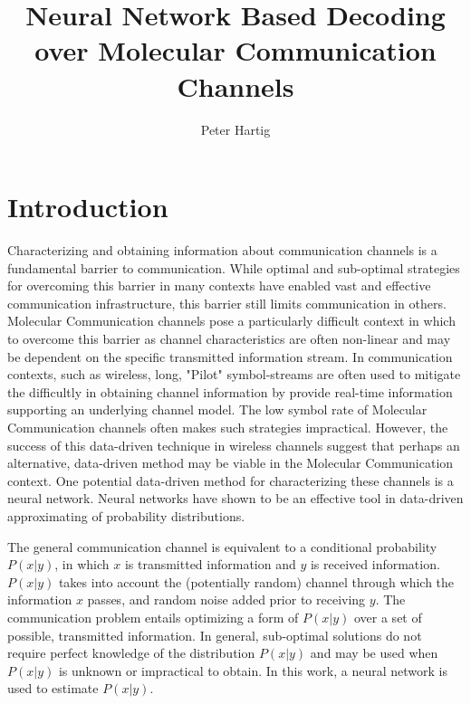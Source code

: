 \documentclass[12pt,a4paper]{report}
\title{Neural Network Based Decoding over Molecular Communication Channels}
\author{Peter Hartig}
\begin{document}
\maketitle

\begin{abstract}

\end{abstract}

\newpage
\tableofcontents
\newpage

\section{Introduction}
Characterizing and obtaining information about communication channels is a fundamental barrier to communication. While optimal and sub-optimal strategies for overcoming this barrier in many contexts have enabled vast and effective communication infrastructure, this barrier still limits communication in others. Molecular Communication channels pose a particularly difficult context in which to overcome this barrier as channel characteristics are often non-linear and may be dependent on the specific transmitted information stream.
In communication contexts, such as wireless, long, "Pilot" symbol-streams are often used to mitigate the difficultly in obtaining channel information by provide real-time information supporting an underlying channel model. The low symbol rate of Molecular Communication channels often makes such strategies impractical. However, the success of this data-driven technique in wireless channels suggest that perhaps an alternative, data-driven method may be viable in the Molecular Communication context. One potential data-driven method for characterizing these channels is a neural network. Neural networks have shown to be an effective tool in data-driven approximating of probability distributions.
\par

The general communication channel is equivalent to a conditional probability $P(x|y)$, in which $x$ is transmitted information and $y$ is received information.  $P(x|y)$ takes into account the (potentially random) channel through which the information $x$ passes, and random noise added prior to receiving $y$. The communication problem entails optimizing a form of $P(x|y)$ over a set of possible, transmitted information. In general, sub-optimal solutions do not require perfect knowledge of the distribution $P(x|y)$ and may be used when $P(x|y)$ is unknown or impractical to obtain. In this work, a neural network is used to estimate $P(x|y)$.
\end{document}
